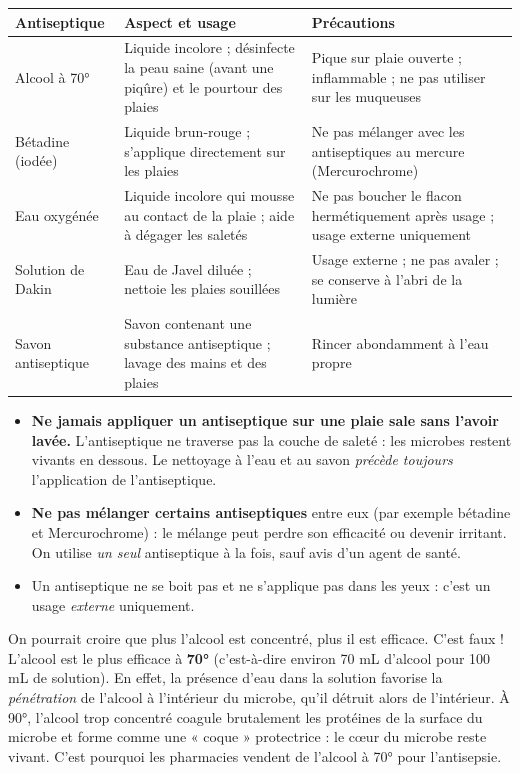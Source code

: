 \documentclass[11pt]{article}
\begin{document}
\begin{center}
\begin{tabularx}{\linewidth}{|l|X|X|}
\hline
\rowcolor{popblueL} \textbf{Antiseptique} & \textbf{Aspect et usage} & \textbf{Précautions} \\
\hline
Alcool à 70° & Liquide incolore ; désinfecte la peau saine (avant une piqûre) et le pourtour des plaies & Pique sur plaie ouverte ; inflammable ; ne pas utiliser sur les muqueuses \\
\hline
Bétadine (iodée) & Liquide brun-rouge ; s'applique directement sur les plaies & Ne pas mélanger avec les antiseptiques au mercure (Mercurochrome) \\
\hline
Eau oxygénée & Liquide incolore qui mousse au contact de la plaie ; aide à dégager les saletés & Ne pas boucher le flacon hermétiquement après usage ; usage externe uniquement \\
\hline
Solution de Dakin & Eau de Javel diluée ; nettoie les plaies souillées & Usage externe ; ne pas avaler ; se conserve à l'abri de la lumière \\
\hline
Savon antiseptique & Savon contenant une substance antiseptique ; lavage des mains et des plaies & Rincer abondamment à l'eau propre \\
\hline
\end{tabularx}
\end{center}

\begin{attention}
\begin{itemize}
\item \textbf{Ne jamais appliquer un antiseptique sur une plaie sale sans l'avoir lavée.} L'antiseptique ne traverse pas la couche de saleté : les microbes restent vivants en dessous. Le nettoyage à l'eau et au savon \emph{précède toujours} l'application de l'antiseptique.
\item \textbf{Ne pas mélanger certains antiseptiques} entre eux (par exemple bétadine et Mercurochrome) : le mélange peut perdre son efficacité ou devenir irritant. On utilise \emph{un seul} antiseptique à la fois, sauf avis d'un agent de santé.
\item Un antiseptique ne se boit pas et ne s'applique pas dans les yeux : c'est un usage \emph{externe} uniquement.
\end{itemize}
\end{attention}

\begin{exemplebox}
On pourrait croire que plus l'alcool est concentré, plus il est efficace. C'est faux ! L'alcool est le plus efficace à \textbf{70°} (c'est-à-dire environ 70 mL d'alcool pour 100 mL de solution). En effet, la présence d'eau dans la solution favorise la \emph{pénétration} de l'alcool à l'intérieur du microbe, qu'il détruit alors de l'intérieur. À 90°, l'alcool trop concentré coagule brutalement les protéines de la surface du microbe et forme comme une « coque » protectrice : le cœur du microbe reste vivant. C'est pourquoi les pharmacies vendent de l'alcool à 70° pour l'antisepsie.
\end{exemplebox}
\end{document}
